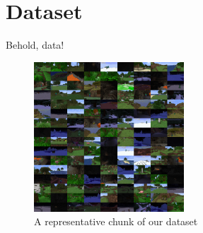 \documentclass[english]{beamer}
\begin{document}
\section{Dataset}
\begin{frame}{Behold, data!}
  \begin{figure}[h]
      \centering
      \includegraphics[width=0.5\textwidth]{../images/dtset_repr.png}
      \caption{A representative chunk of our dataset}
  \end{figure}
\end{frame}
\end{document}
